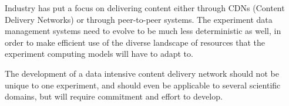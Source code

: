 Industry has put a focus on delivering content either through CDNs (Content
Delivery Networks)  or through peer-to-peer systems.  The experiment data
management systems need to evolve to be much less deterministic as well, in
order to make efficient use of the diverse landscape of resources that the
experiment computing models will have to adapt to.

The development of a data intensive content delivery network should not be
unique to one experiment, and should even be applicable to several scientific
domains, but will require commitment and effort to develop.


